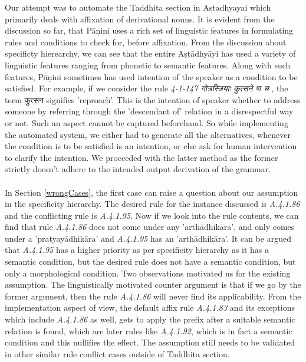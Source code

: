 \documentclass[a4paper,11pt,twoside,openright]{report}
\begin{document}
Our attempt was to automate the Taddhita section in Astadhyayai which primarily deals with affixation of derivational nouns. It is evident from the discussion so far, that Pāṇini uses a rich set of linguistic features in formulating rules and conditions to check for, before affixation. From the discussion about specificty hierearchy, we can see that the entire Aṣṭādhyāyi has used a variety of linguistic features ranging from phonetic to semantic features. Along with such features, Pāṇini sometimes has used intention of the speaker as a condition to be satisfied. For example, if we consider the rule \textsl{ 4-1-147 \skt गोत्रस्त्रियाः कुत्सने ण च }, the term {\skt कुत्सन} signifies 'reproach'. This is the intention of speaker whether to address someone by referring through the 'descendant of' relation in a disrespectful way or not. Such an aspect cannot be captured beforehand. So while implementing the automated system, we either had to generate all the alternatives, whenever the condition is to be satisfied is an intention, or else ask for human intervention to clarify the intention. We proceeded with the latter method as the former strictly doesn't adhere to the intended output derivation of the grammar. 
\\ \\ 
In Section \ref{wrongCases}, the first case can raise a question about our assumption in the specificity hierarchy. The desired rule for the instance discussed is \textsl{ A.4.1.86} and the conflicting rule is \textsl{ A.4.1.95}. Now if we look into the rule contents, we can find that rule \textsl{ A.4.1.86} does not come under any 'arthādhikāra', and only comes under a 'pratyayādhikāra' and \textsl{ A.4.1.95} has an 'arthādhikāra'. It can be argued that \textsl{ A.4.1.95} has a higher priority as per specificity hierarchy as it has a semantic condition, but the desired rule does not have a semantic condition, but only a morphological condition. Two observations motivated us for the existing assumption. The linguistically motivated counter argument is that if we go by the former argument, then the rule \textsl{ A.4.1.86} will never find its applicability. From the implementation aspect of view, the default affix rule \textsl{ A.4.1.83} and its exceptions which include \textsl{ A.4.1.86} as well, gets to apply the prefix after a suitable semantic relation is found, which are later rules like \textsl{ A.4.1.92}, which is in fact a semantic condition and this nullifies the effect. The assumption still needs to be validated in other similar rule conflict cases outside of Taddhita section.
\end{document}
